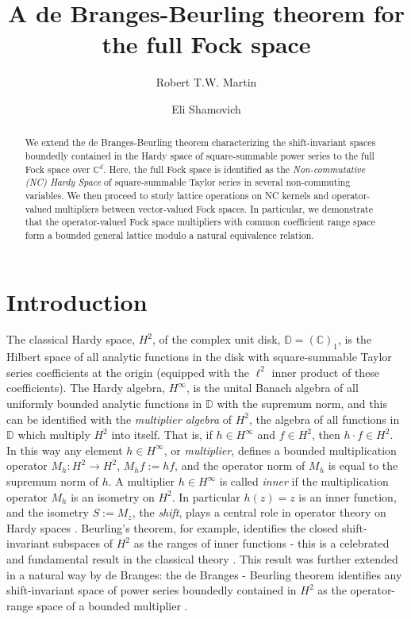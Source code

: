 \documentclass[11pt]{article}
\title{A de Branges-Beurling theorem for the full Fock space}
\author[1]{Robert T.W. Martin}
\affil[1]{\footnotesize University of Manitoba}
\author[2]{Eli Shamovich}
\affil[2]{ \footnotesize Ben-Gurion University of the Negev}
\date{}
\def\C{\mathbb{C}}
\def\D{\mathbb{D}}
\numberwithin{equation}{section}
\numberwithin{subsection}{section}
\theoremstyle{definition}
\begin{document}

\maketitle


\begin{abstract}
We extend the de Branges-Beurling theorem characterizing the shift-invariant spaces boundedly contained in the Hardy space of square-summable power series to the full Fock space over $\C ^d$. Here, the full Fock space is identified as the \emph{Non-commutative (NC) Hardy Space} of square-summable Taylor series in several non-commuting variables. We then proceed to study lattice operations on NC kernels and operator-valued multipliers between vector-valued Fock spaces. In particular, we demonstrate that the operator-valued Fock space multipliers with common coefficient range space form a bounded general lattice modulo a natural equivalence relation.
\end{abstract}
\onehalfspace

\section{Introduction}

The classical Hardy space, $H^2$, of the complex unit disk, $\D = (\C ) _1$, is the Hilbert space of all analytic functions in the disk with square-summable Taylor series coefficients at the origin (equipped with the $\ell ^2$ inner product of these coefficients). The Hardy algebra, $H^\infty$, is the unital Banach algebra of all uniformly bounded analytic functions in $\D$ with the supremum norm, and this can be identified with the \emph{multiplier algebra} of $H^2$, the algebra of all functions in $\D$ which multiply $H^2$ into itself.  That is, if $h \in H^\infty$ and $f \in H^2$, then $h \cdot f \in H^2$. In this way any element $h \in H^\infty$, or \emph{multiplier}, defines a bounded multiplication operator $M_h :H^2 \rightarrow H^2$, $M_h f := hf$, and the operator norm of $M_h$ is equal to the supremum norm of $h$. A multiplier $h \in H^\infty$ is called \emph{inner} if the multiplication operator $M_h$ is an isometry on $H^2$. In particular $h(z) = z$ is an inner function, and the isometry $S:= M_z$, the \emph{shift}, plays a central role in operator theory on Hardy spaces \cite{Nik-shift,NF}. Beurling's theorem, for example, identifies the closed shift-invariant subspaces of $H^2$ as the ranges of inner functions - this is a celebrated and fundamental result in the classical theory \cite{Beu48,Hoff}.  This result was further extended in a natural way by de Branges: the de Branges - Beurling theorem identifies any shift-invariant space of power series boundedly contained in $H^2$ as the operator-range space of a bounded multiplier \cite{Sarason-dBBthm}. %
\end{document}
